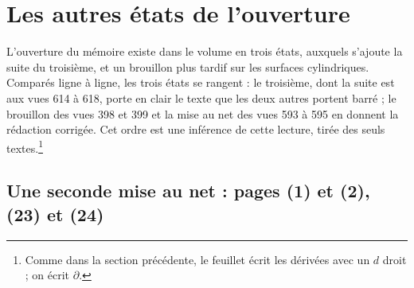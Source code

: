 \documentclass[11pt,a4paper]{article}
\begin{document}
\section*{Les autres états de l'ouverture}

L'ouverture du mémoire existe dans le volume en trois états, auxquels s'ajoute la
suite du troisième, et un brouillon plus tardif sur les surfaces cylindriques.
Comparés ligne à ligne, les trois états se rangent : le troisième, dont la suite est
aux vues 614 à 618, porte en clair le texte que les deux autres portent barré ; le
brouillon des vues 398 et 399 et la mise au net des vues 593 à 595 en donnent la
rédaction corrigée. Cet ordre est une inférence de cette lecture, tirée des seuls
textes.\footnote{Comme dans la section précédente, le feuillet écrit les dérivées avec
un $d$ droit ; on écrit $\partial$.}

\subsection*{Une seconde mise au net : pages (1) et (2), (23) et (24)}
\end{document}
